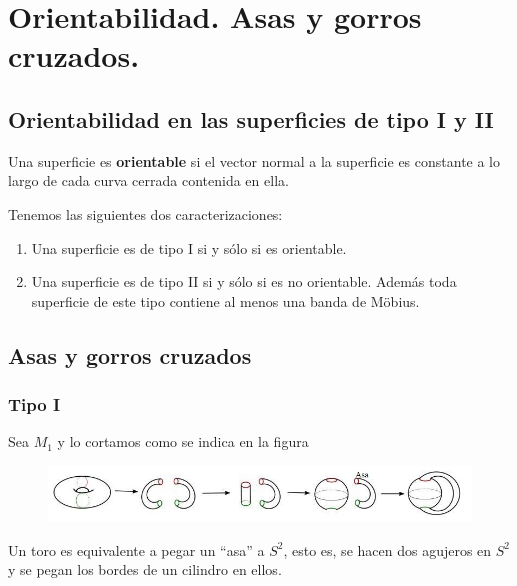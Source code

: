 \documentclass[GTS.tex]{subfiles}
\begin{document}

\section{Orientabilidad. Asas y gorros cruzados.}
\subsection{Orientabilidad en las superficies de tipo I y II}
\begin{defi} Una superficie es \textbf{orientable} si el vector normal a la superficie es constante a lo largo de cada curva cerrada contenida en ella.
\end{defi}
\begin{teorema} Tenemos las siguientes dos caracterizaciones:
\begin{enumerate}
\item Una superficie es de tipo I si y sólo si es orientable.
\item Una superficie es de tipo II si y sólo si es no orientable. Además toda superficie de este tipo contiene al menos una banda de Möbius.
\end{enumerate}

\end{teorema}

\subsection{Asas y gorros cruzados}
\subsubsection{Tipo I}
\begin{flushleft}
Sea $M_1$ y lo cortamos como se indica en la figura
\begin{figure}[h!]
	\includegraphics[scale=0.9]{asaink}
\end{figure}
Un toro es equivalente a pegar un ``asa'' a $S^2$, esto es, se hacen dos agujeros en $S^2$ y se pegan los bordes de un cilindro en ellos.
\end{flushleft}\
\end{document}
